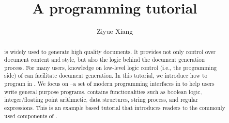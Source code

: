 \documentclass{ltugboat}
\title{A \LTT{} programming tutorial}
\author{Ziyue Xiang}
\begin{document}
\begin{abstract}
\LT{} is widely used to generate high quality documents.
It provides not only control over document content and style, but also the logic behind the document generation process.
For many users, knowledge on low-level logic control (i.e., the programming side) of \LT{} can facilitate document generation.
In this tutorial, we introduce how to program in \LT{}.
We focus on \LTT{}--a set of modern programming interfaces in \LT{} to help users write general purpose programs.
\LTT{} contains functionalities such as boolean logic, integer/floating point arithmetic, data structures, string process, and regular expressions.
This is an example based \LTT{} tutorial that introduces readers to the commonly used components of \LTT{}.
\end{abstract}

\maketitle

\tableofcontents
\ListOfCodeExample

% 
% 
% 
% 






\makesignature
\end{document}
